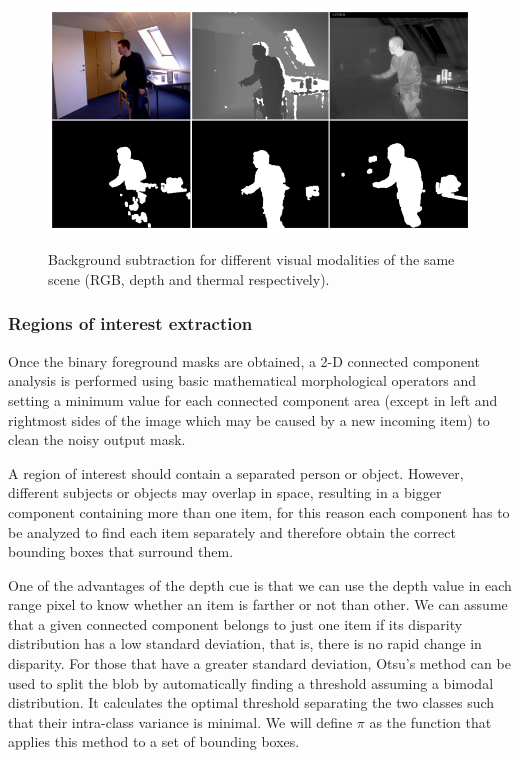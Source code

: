 \documentclass[10pt,twocolumn,letterpaper]{article}
\begin{document}
 \begin{figure}[!h]
{\includegraphics[width=\linewidth]{bs.eps}}
\caption{Background subtraction for different visual
modalities of the same scene (RGB, depth and thermal respectively).
\label{fig:bscomparison}}
\end{figure}

\subsubsection{Regions of interest extraction}
\label{sssec:extreg}
Once the binary foreground masks are obtained, a 2-D connected component analysis is performed using basic mathematical morphological operators and setting a minimum value for each connected component area (except in left and rightmost sides of the image which may be caused by a new incoming item) to clean the noisy output mask. 

A region of interest should contain a separated person or object. However, different subjects or objects may overlap in space, resulting in a bigger component containing more than one item, for this reason each component has to be analyzed to find each item separately and therefore obtain the correct bounding boxes that surround them.

One of the advantages of the depth cue is that we can use the depth value in each range pixel to know whether an item is farther or not than other. We can assume that a given connected component belongs to just one item if its disparity distribution has a low standard deviation, that is, there is no rapid change in disparity. For those that have a greater standard deviation, Otsu's method \cite{otsu1975threshold} can be used to split the blob by automatically finding a threshold assuming a bimodal distribution. It calculates the optimal threshold separating the two classes such that their intra-class variance is minimal. We will define $\pi$ as the function that applies this method to a set of bounding boxes.
\end{document}
